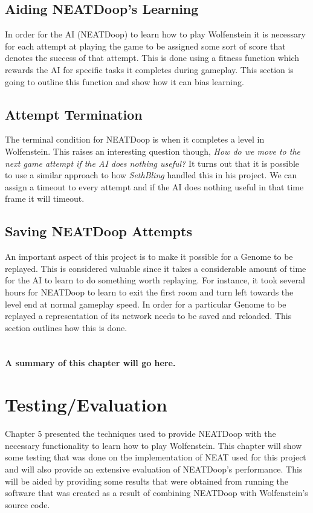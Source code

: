 \documentclass[]{Learning-to-Play-Wolfenstein-thesis}
\begin{document}
\section{Aiding NEATDoop's Learning}
In order for the AI (NEATDoop) to learn how to play Wolfenstein it is necessary for each attempt at playing the game to be assigned some sort of score that denotes the success of that attempt. This is done using a fitness function which rewards the AI for specific tasks it completes during gameplay. This section is going to outline this function and show how it can bias learning.

\section{Attempt Termination}
The terminal condition for NEATDoop is when it completes a level in Wolfenstein. This raises an interesting question though, \textit{How do we move to the next game attempt if the AI does nothing useful?} It turns out that it is possible to use a similar approach to how \textit{SethBling} handled this in his project. We can assign a timeout to every attempt and if the AI does nothing useful in that time frame it will timeout.

\section{Saving NEATDoop Attempts}
An important aspect of this project is to make it possible for a Genome to be replayed. This is considered valuable since it takes a considerable amount of time for the AI to learn to do something worth replaying. For instance, it took several hours for NEATDoop to learn to exit the first room and turn left towards the level end at normal gameplay speed. In order for a particular Genome to be replayed a representation of its network needs to be saved and reloaded. This section outlines how this is done.\\\\\\\textbf{A summary of this chapter will go here.}


\chapter{Testing/Evaluation}%
Chapter 5 presented the techniques used to provide NEATDoop with the necessary functionality to learn how to play Wolfenstein. This chapter will show some testing that was done on the implementation of NEAT used for this project and will also provide an extensive evaluation of NEATDoop's performance. This will be aided by providing some results that were obtained from running the software that was created as a result of combining NEATDoop with Wolfenstein's source code.
\end{document}
